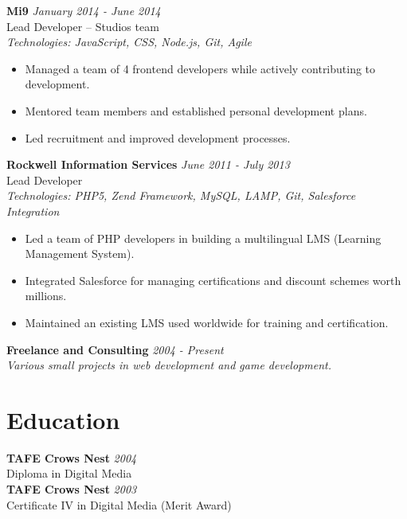 \documentclass[a4paper,10pt]{article}
\begin{document}
\textbf{Mi9} \hfill \textit{January 2014 - June 2014} \\
Lead Developer – Studios team \\
\textit{Technologies: JavaScript, CSS, Node.js, Git, Agile}
\begin{itemize}
    \item Managed a team of 4 frontend developers while actively contributing to development.
    \item Mentored team members and established personal development plans.
    \item Led recruitment and improved development processes.
\end{itemize}

\textbf{Rockwell Information Services} \hfill \textit{June 2011 - July 2013} \\
Lead Developer \\
\textit{Technologies: PHP5, Zend Framework, MySQL, LAMP, Git, Salesforce Integration}
\begin{itemize}
    \item Led a team of PHP developers in building a multilingual LMS (Learning Management System).
    \item Integrated Salesforce for managing certifications and discount schemes worth millions.
    \item Maintained an existing LMS used worldwide for training and certification.
\end{itemize}

\textbf{Freelance and Consulting} \hfill \textit{2004 - Present} \\
\textit{Various small projects in web development and game development.}

\section*{Education}

\textbf{TAFE Crows Nest} \hfill \textit{2004} \\
Diploma in Digital Media \\
\textbf{TAFE Crows Nest} \hfill \textit{2003} \\
Certificate IV in Digital Media (Merit Award)
\end{document}
